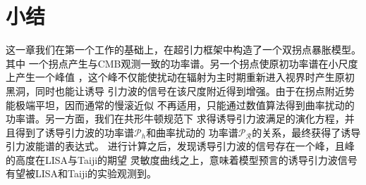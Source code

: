 \section{小结}

这一章我们在第一个工作的基础上，在超引力框架中构造了一个双拐点暴胀模型。其中
一个拐点产生与CMB观测一致的功率谱。另一个拐点使原初功率谱在小尺度上产生一个峰值
，这个峰不仅能使扰动在辐射为主时期重新进入视界时产生原初黑洞，同时也能让诱导
引力波的信号在该尺度附近得到增强。由于在拐点附近势能极端平坦，因而通常的慢滚近似
不再适用，只能通过数值算法得到曲率扰动的功率谱。另一方面，我们在共形牛顿规范下
求得诱导引力波满足的演化方程，并且得到了诱导引力波的功率谱$\mathcal{P}_{h}$和曲率扰动的
功率谱$\mathcal{P}_{\mathcal{R}}$的关系，最终获得了诱导引力波能谱的表达式。
进行计算之后，发现诱导引力波的信号存在一个峰，且峰的高度在LISA与Taiji的期望
灵敏度曲线之上，意味着模型预言的诱导引力波信号有望被LISA和Taiji的实验观测到。
